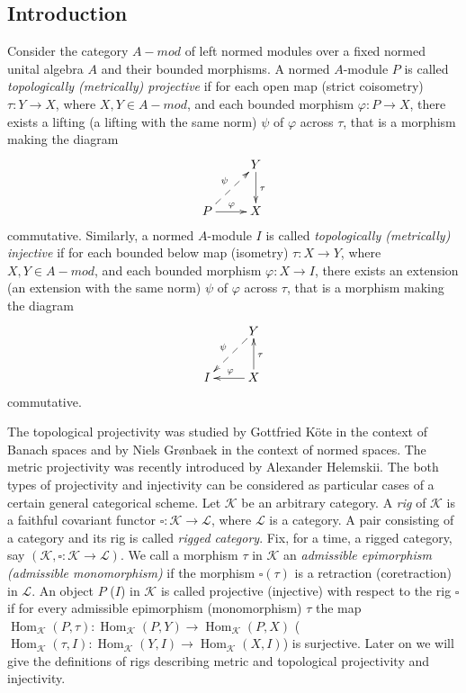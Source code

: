 \documentclass[a0b,landscape]{a0poster}
\begin{document}
\begin{multicols}{4} %

\small

\section*{Introduction}


Consider the category $A-mod$ of left normed modules over a fixed normed unital algebra $A$ and their bounded morphisms. A normed $A$-module $P$ is called \textit{topologically 
(metrically) projective} if for each open map (strict coisometry) $\tau : Y \to X$, where $X, Y \in A-mod$, and each bounded morphism $\varphi : P \to X$, there exists a 
lifting (a lifting with the same norm) $\psi$ of $\varphi$ across $\tau$, that is a morphism making the diagram
$$
\xymatrix{
& {Y} \ar[d]^{\tau}\\
{P} \ar@{-->}[ur]^{\psi} \ar[r]^{\varphi} &{X}}
$$
commutative. Similarly, a normed $A$-module $I$ is called \textit{topologically (metrically) injective} if for each bounded below map (isometry) $\tau : X \to Y$, where 
$X, Y \in A-mod$, and each bounded morphism $\varphi : X \to I$, there exists an extension (an extension with the same norm) $\psi$ of $\varphi$ across $\tau$, that
is a morphism making the diagram
$$
\xymatrix{
& {Y} \ar@{-->}[dl]_{\psi}\\
{I}  &{X} \ar[l]_{\varphi} \ar[u]_{\tau}
}
$$
commutative.

The topological projectivity was studied by Gottfried K\"{o}te in the context of Banach spaces and by Niels Gr{\o}nbaek in the context of normed spaces. The metric projectivity was recently introduced by Alexander Helemskii. The both types of projectivity and injectivity can be considered as particular cases of a certain general categorical scheme. Let $\mathcal{K}$ be an arbitrary category. A 
\textit{rig} of $\mathcal{K}$ is a faithful covariant functor $\square : \mathcal{K} \to \mathcal{L}$, where $\mathcal{L}$ is a category. A pair consisting of a category 
and its rig is called \textit{rigged category}. Fix, for a time, a rigged category, say $\left (\mathcal{K}, \square : \mathcal{K} \to \mathcal{L}\right )$. We call a 
morphism $\tau$ in $\mathcal{K}$ an \textit{admissible epimorphism (admissible monomorphism)} if the morphism $\square(\tau)$ is a retraction (coretraction) in $\mathcal{L}$. An 
object $P$ ($I$) in $\mathcal{K}$ is called projective (injective) with respect to the rig $\square$ if for every admissible epimorphism (monomorphism) $\tau$ the map
$\operatorname{Hom}_{\mathcal{K}}(P,\tau):\operatorname{Hom}_{\mathcal{K}}(P,Y)\to\operatorname{Hom}_{\mathcal{K}}(P,X)$ 
($\operatorname{Hom}_{\mathcal{K}}(\tau,I):\operatorname{Hom}_{\mathcal{K}}(Y,I)\to\operatorname{Hom}_{\mathcal{K}}(X,I)$) is surjective. Later on we will give the definitions of 
rigs describing metric and topological projectivity and injectivity.


\end{multicols}
\end{document}
